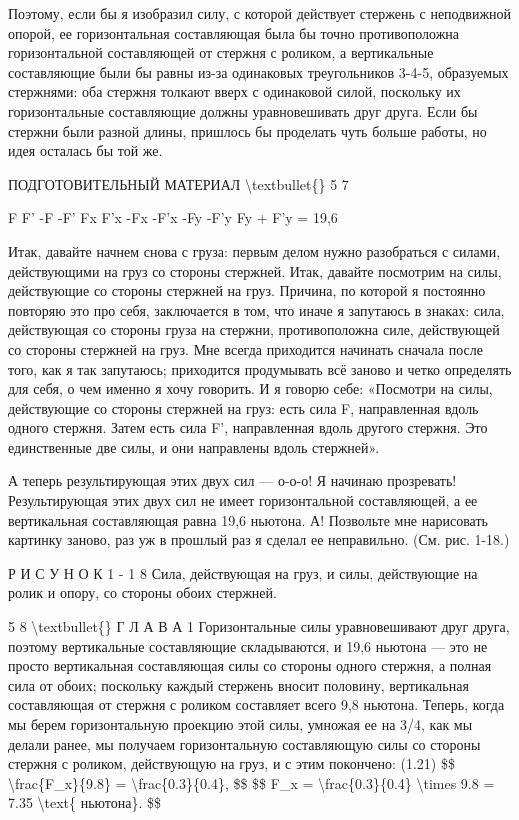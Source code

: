 \documentclass[10pt,oneside]{article}
\begin{document}
Поэтому, если бы я изобразил силу, с которой действует стержень с неподвижной опорой, ее горизонтальная составляющая была бы точно противоположна горизонтальной составляющей от стержня с роликом, а вертикальные составляющие были бы равны из-за одинаковых треугольников 3-4-5, образуемых стержнями: оба стержня толкают вверх с одинаковой силой, поскольку их горизонтальные составляющие должны уравновешивать друг друга. Если бы стержни были разной длины, пришлось бы проделать чуть больше работы, но идея осталась бы той же.\par

ПОДГОТОВИТЕЛЬНЫЙ МАТЕРИАЛ \textbackslash{}textbullet\{\} 5 7\par

F F' -F -F' Fx F'x -Fx -F'x -Fy -F'y Fy + F'y = 19,6\par

Итак, давайте начнем снова с груза: первым делом нужно разобраться с силами, действующими на груз со стороны стержней. Итак, давайте посмотрим на силы, действующие со стороны стержней на груз. Причина, по которой я постоянно повторяю это про себя, заключается в том, что иначе я запутаюсь в знаках: сила, действующая со стороны груза на стержни, противоположна силе, действующей со стороны стержней на груз. Мне всегда приходится начинать сначала после того, как я так запутаюсь; приходится продумывать всё заново и четко определять для себя, о чем именно я хочу говорить. И я говорю себе: «Посмотри на силы, действующие со стороны стержней на груз: есть сила F, направленная вдоль одного стержня. Затем есть сила F', направленная вдоль другого стержня. Это единственные две силы, и они направлены вдоль стержней».\par

А теперь результирующая этих двух сил --- о-о-о! Я начинаю прозревать! Результирующая этих двух сил не имеет горизонтальной составляющей, а ее вертикальная составляющая равна 19,6 ньютона. А! Позвольте мне нарисовать картинку заново, раз уж в прошлый раз я сделал ее неправильно. (См. рис. 1-18.)\par

Р И С У Н О К  1 - 1 8 Сила, действующая на груз, и силы, действующие на ролик и опору, со стороны обоих стержней.\par

5 8 \textbackslash{}textbullet\{\} Г Л А В А  1 Горизонтальные силы уравновешивают друг друга, поэтому вертикальные составляющие складываются, и 19,6 ньютона --- это не просто вертикальная составляющая силы со стороны одного стержня, а полная сила от обоих; поскольку каждый стержень вносит половину, вертикальная составляющая от стержня с роликом составляет всего 9,8 ньютона. Теперь, когда мы берем горизонтальную проекцию этой силы, умножая ее на 3/4, как мы делали ранее, мы получаем горизонтальную составляющую силы со стороны стержня с роликом, действующую на груз, и с этим покончено: (1.21) \$\$ \textbackslash{}frac\{F\_x\}\{9.8\} = \textbackslash{}frac\{0.3\}\{0.4\}, \$\$ \$\$ F\_x = \textbackslash{}frac\{0.3\}\{0.4\} \textbackslash{}times 9.8 = 7.35 \textbackslash{}text\{ ньютона\}. \$\$\par
\end{document}
